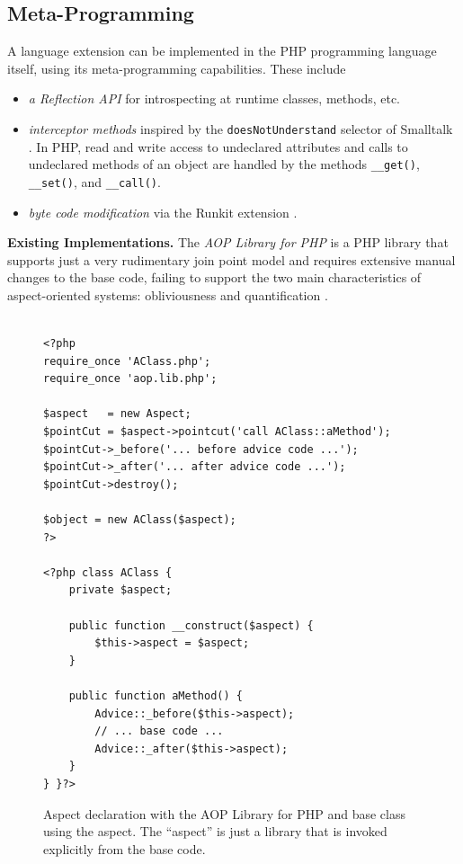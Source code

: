 \documentclass{acm_proc_article-sp}
\begin{document}
\subsection{Meta-Programming}
A language extension can be implemented in the PHP programming
language itself, using its meta-programming capabilities. These
include
\begin{itemize}
    \item \emph{a Reflection API} \cite{PHP-REFLECTION} for introspecting
          at runtime classes, methods, etc.
    \item \emph{interceptor methods} inspired by the
\texttt{doesNotUnderstand} selector of Smalltalk \cite{mw87}. In
PHP, read and write access to undeclared attributes and calls to
undeclared methods of an object are handled by the methods
\texttt{\_\_get()}, \texttt{\_\_set()}, and \texttt{\_\_call()}.
    \item \emph{byte code modification} via the Runkit extension
    \cite{RUNKIT}.
\end{itemize}

\textbf{Existing Implementations. } %
The \emph{AOP Library for PHP} \cite{AOPL4PHP} is a PHP library
that supports just a very rudimentary join point model and
requires extensive manual changes to the base code, failing to
support the two main characteristics of aspect-oriented systems:
obliviousness and quantification \cite{filman00}.

\begin{figure}[h!]%
\centering \small{\begin{verbatim}

<?php
require_once 'AClass.php';
require_once 'aop.lib.php';

$aspect   = new Aspect;
$pointCut = $aspect->pointcut('call AClass::aMethod');
$pointCut->_before('... before advice code ...');
$pointCut->_after('... after advice code ...');
$pointCut->destroy();

$object = new AClass($aspect);
?>

<?php class AClass {
    private $aspect;

    public function __construct($aspect) {
        $this->aspect = $aspect;
    }

    public function aMethod() {
        Advice::_before($this->aspect);
        // ... base code ...
        Advice::_after($this->aspect);
    }
} }?>
\end{verbatim}}
\caption{Aspect declaration with the AOP Library for PHP and base
class using the aspect. The ``aspect'' is just a library that is
invoked explicitly from the base code.} \label{AOPL4PHP-Aspect}
\end{figure}
\end{document}
